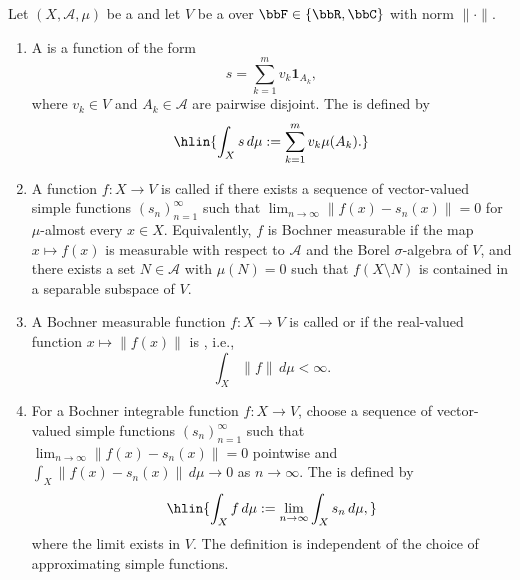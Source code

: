 \begin{definition} \label{definition:vector_valued_lebesgue_integral_into_normed_vector_space}
Let $(X,\mathcal{A},\mu)$ be a  and let $V$ be a  over $\bbF \in \{\bbR, \bbC\}$ with norm $\|\cdot\|$.

\begin{enumerate}
  \item A  is a function of the form
  $$s = \sum_{k=1}^m v_k \mathbf{1}_{A_k},$$
  where $v_k \in V$ and $A_k \in \mathcal{A}$ are pairwise disjoint. The  is defined by
  $$\hlin{\int_X s\,d\mu := \sum_{k=1}^m v_k \mu(A_k).}$$

  \item A function $f : X \to V$ is called  if there exists a sequence of vector-valued simple functions $(s_n)_{n=1}^\infty$ such that $\lim_{n \to \infty} \|f(x) - s_n(x)\| = 0$ for $\mu$-almost every $x \in X$. Equivalently, $f$ is Bochner measurable if the map $x \mapsto f(x)$ is measurable with respect to $\mathcal{A}$ and the Borel $\sigma$-algebra of $V$, and there exists a set $N \in \mathcal{A}$ with $\mu(N) = 0$ such that $f(X \setminus N)$ is contained in a separable subspace of $V$.

  \item A Bochner measurable function $f : X \to V$ is called  or  if the real-valued function $x \mapsto \|f(x)\|$ is , i.e.,
  $$\int_X \|f\|\,d\mu < \infty.$$

  \item For a Bochner integrable function $f : X \to V$, choose a sequence of vector-valued simple functions $(s_n)_{n=1}^\infty$ such that $\lim_{n \to \infty} \|f(x) - s_n(x)\| = 0$ pointwise and $\int_X \|f(x) - s_n(x)\|\,d\mu \to 0$ as $n \to \infty$. The  is defined by
  $$\hlin{\int_X f\,d\mu := \lim_{n \to \infty} \int_X s_n\,d\mu,}$$
  where the limit exists in $V$. The definition is independent of the choice of approximating simple functions.


\end{enumerate}
\end{definition}
